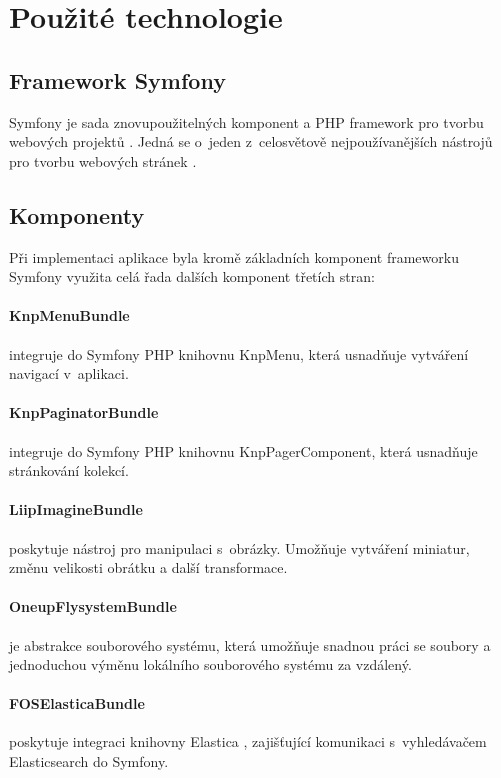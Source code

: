 \section{Použité technologie}\label{implementace-technologie}

\subsection{Framework Symfony}  
Symfony je sada znovupoužitelných komponent a PHP framework pro tvorbu webových projektů \autocite{symfony}. Jedná se o~jeden z~celosvětově nejpoužívanějších nástrojů pro tvorbu webových stránek \autocite{php-frameworky}.

\subsection{Komponenty}
Při implementaci aplikace byla kromě základních komponent frameworku Symfony využita celá řada dalších komponent třetích stran:

    \paragraph{KnpMenuBundle}
    integruje do Symfony PHP knihovnu KnpMenu, která usnadňuje vytváření navigací v~aplikaci. \autocite{knpmenu} 

    \paragraph{KnpPaginatorBundle}
    integruje do Symfony PHP knihovnu KnpPagerComponent, která usnadňuje stránkování kolekcí. \autocite{knppaginator}
    
    \paragraph{LiipImagineBundle}
    poskytuje nástroj pro manipulaci s~obrázky. Umožňuje vytváření miniatur, změnu velikosti obrátku a další transformace. \autocite{liipimagine}

    \paragraph{OneupFlysystemBundle}
    je abstrakce souborového systému, která umožňuje snadnou práci se soubory a jednoduchou výměnu lokálního souborového systému za vzdálený. \autocite{oneupflysytem}
   
    \paragraph{FOSElasticaBundle}
    poskytuje integraci knihovny Elastica \autocite{elastica}, zajišťující komunikaci s~vyhledávačem Elasticsearch \autocite{elasticsearch} do Symfony. \autocite{foselastica}  
   
